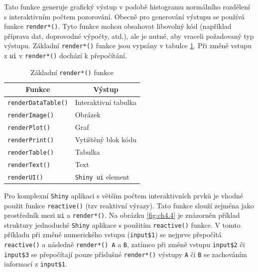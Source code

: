\documentclass[12pt,]{article}
\begin{document}
Tato funkce generuje grafický výstup v podobě histogramu normálního
rozdělení s interaktivním počtem pozorování. Obecně pro generování
výstupu se používá funkce \texttt{render*()}. Tyto funkce mohou
obsahovat libovolný kód (například příprava dat, doprovodné výpočty,
atd.), ale je nutné, aby vraceli požadovaný typ výstupu. Základní
\texttt{render*()} funkce jsou vypsány v tabulce \ref{tab5}. Při změně
vstupu z \texttt{ui} v \texttt{render*()} dochází k přepočítání.

\begin{table}[H]
\centering
\begin{tabular}{|l|l|}
\hline
\multicolumn{1}{|c|}{Funkce} & \multicolumn{1}{c|}{Výstup} \\ \hline
\texttt{renderDataTable()}   & Interaktivní tabulka        \\ \hline
\texttt{renderImage()}       & Obrázek                     \\ \hline
\texttt{renderPlot()}        & Graf                        \\ \hline
\texttt{renderPrint()}       & Vytištěný blok kódu         \\ \hline
\texttt{renderTable()}       & Tabulka                     \\ \hline
\texttt{renderText()}        & Text                        \\ \hline
\texttt{renderUI()}          & \texttt{Shiny ui} element   \\ \hline
\end{tabular}
\caption{Základní \texttt{render*()} funkce}
\label{tab5}
\end{table}

\qquad Pro komplexní \texttt{Shiny} aplikaci s větším počtem
interaktivních prvků je vhodné použit funkce \texttt{reactive()} (tzv
reaktivní výrazy). Tato funkce slouží zejména jako prostředník mezi
\texttt{ui} a \texttt{render*()}. Na obrázku \ref{fig:ch4.4} je
znázorněn příklad struktury jednoduché \texttt{Shiny} aplikace s
použitím \texttt{reactive()} funkce. V tomto příkladu při změně
numerického vstupu (\texttt{input\$1}) se nejprve přepočítá
\texttt{reactive()} a následně \texttt{render*()\ A} a \texttt{B},
zatímco při změně vstupu \texttt{input\$2} či \texttt{input\$3} se
přepočítají pouze příslušné \texttt{render*()} výstupy \texttt{A} či
\texttt{B} se zachováním informací z \texttt{input\$1}.
\end{document}

